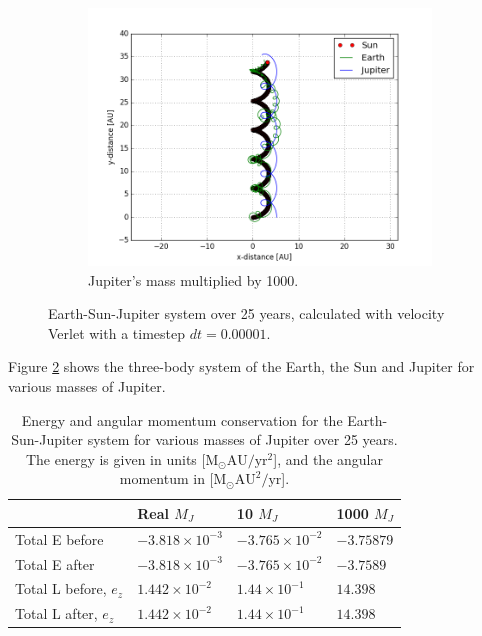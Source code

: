 \documentclass[10pt,showpacs,preprintnumbers,footinbib,amsmath,amssymb,aps,prl,twocolumn,groupedaddress,superscriptaddress,showkeys]{revtex4-1}
\begin{document}
\begin{figure}
	
    \begin{subfigure}[b]{0.4\textwidth}
		\includegraphics[width=\textwidth]{earth_sun_jupiter_verlet_25yr_dt0_00001_MJ1000.png}
		\caption{Jupiter's mass multiplied by 1000.}
		\label{fig:e_s_j_dt0_00001_m1000}
	\end{subfigure}
	\caption{Earth-Sun-Jupiter system over 25 years, calculated with velocity Verlet with a timestep $dt = 0.00001$.}
    \label{fig:e_s_j_25yr}
\end{figure}

Figure \ref{fig:e_s_j_25yr} shows the three-body system of the Earth, the Sun and Jupiter for various masses of Jupiter.


\begin{table}[]
\centering
\caption{Energy and angular momentum conservation for the Earth-Sun-Jupiter system for various masses of Jupiter over 25 years. The energy is given in units [$\mathrm{M_\odot AU/yr^2}$], and the angular momentum in [$\mathrm{M_\odot AU^2/yr}$].}
\label{tab:jupiter_mass_energies}
\begin{tabular}{l|l|l|l}
                                    & Real $M_J$      & 10 $M_J$  & 1000 $M_J$ \\
\hline
Total E before                 & $-3.818\times 10^{-3}$ & $-3.765\times 10^{-2}$ & $-3.75879$              \\
Total E after                  & $-3.818\times 10^{-3}$ & $-3.765\times 10^{-2}$ & $-3.7589$               \\
Total L before, $e_z$ & $1.442\times 10^{-2}$  & $1.44\times 10^{-1}$   & $14.398$                \\
Total L after, $e_z$   & $1.442\times 10^{-2}$  & $1.44\times 10^{-1}$   & $14.398$               
\end{tabular}
\end{table}
\end{document}
